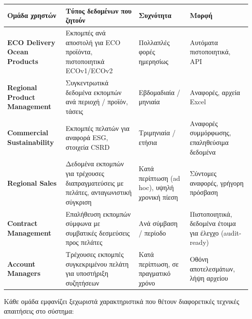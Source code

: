 \documentclass[11pt,a4paper,greek,twoside]{template-xe}
\begin{document}
\begin{longtable}[]{@{}
  >{\raggedright\arraybackslash}p{}
  >{\raggedright\arraybackslash}p{}
  >{\raggedright\arraybackslash}p{}
  >{\raggedright\arraybackslash}p{}@{}}
\toprule\noalign{}
\begin{minipage}[b]{\linewidth}\raggedright
Ομάδα χρηστών
\end{minipage} & \begin{minipage}[b]{\linewidth}\raggedright
Τύπος δεδομένων που ζητούν
\end{minipage} & \begin{minipage}[b]{\linewidth}\raggedright
Συχνότητα
\end{minipage} & \begin{minipage}[b]{\linewidth}\raggedright
Μορφή
\end{minipage} \\
\midrule\noalign{}
\endhead
\bottomrule\noalign{}
\endlastfoot
\textbf{ECO Delivery Ocean Products} & Εκπομπές ανά αποστολή για ECO
προϊόντα, πιστοποιητικά ECOv1/ECOv2 & Πολλαπλές φορές ημερησίως &
Αυτόματα πιστοποιητικά, API \\
\textbf{Regional Product Management} & Συγκεντρωτικά δεδομένα εκπομπών
ανά περιοχή / προϊόν, τάσεις & Εβδομαδιαία / μηνιαία & Αναφορές, αρχεία
Excel \\
\textbf{Commercial Sustainability} & Εκπομπές πελατών για αναφορά ESG,
στοιχεία CSRD & Τριμηνιαία / ετήσια & Αναφορές συμμόρφωσης, επαληθεύσιμα
δεδομένα \\
\textbf{Regional Sales} & Δεδομένα εκπομπών για τρέχουσες
διαπραγματεύσεις με πελάτες, ανταγωνιστική σύγκριση & Κατά περίπτωση (ad
hoc), υψηλή χρονική πίεση & Σύντομες αναφορές, γρήγορη πρόσβαση \\
\textbf{Contract Management} & Επαλήθευση εκπομπών σύμφωνα με συμβατικές
δεσμεύσεις προς πελάτες & Ανά σύμβαση / περίοδο & Πιστοποιητικά,
δεδομένα έτοιμα για έλεγχο (audit-ready) \\
\textbf{Account Managers} & Τρέχουσες εκπομπές συγκεκριμένου πελάτη για
υποστήριξη συζητήσεων & Κατά περίπτωση, σε πραγματικό χρόνο & Οθόνη
αποτελεσμάτων, λήψη αρχείου \\
\end{longtable}

Κάθε ομάδα εμφανίζει ξεχωριστά χαρακτηριστικά που θέτουν διαφορετικές
τεχνικές απαιτήσεις στο σύστημα:
\end{document}
